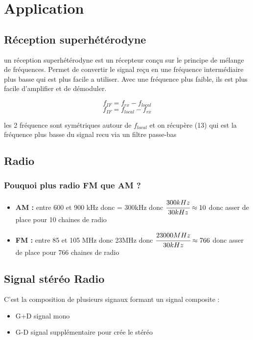 \section{Application}
	\subsection{Réception superhétérodyne}
		un réception superhétérodyne est un récepteur conçu sur le principe de mélange de fréquences. Permet de convertir le signal reçu en une fréquence intermédiaire plus basse qui est plus facile a utiliser. Avec une fréquence plus faible, ils est plus facile d'amplifier et de démoduler.
	
		\begin{equation}
			 f_{IF} = f_{rx}-f_{local}
		\end{equation}
		\begin{equation}
			 f_{IF} = f_{local}-f_{rx}
		\end{equation}
		
		les 2 fréquence sont symétriques autour de $f_{local}$ et on récupère (13) qui est la fréquence plus basse du signal recu via un filtre passe-bas
		
	\subsection{Radio}
		\subsubsection{Pouquoi plus radio FM que AM ?}
			\begin{itemize}
				\item \textbf{AM :} entre 600 et 900 kHz donc = 300kHz donc $\cfrac{300kHz}{30kHz} \approx 10$ donc asser de place pour 10 chaines de radio
				\item \textbf{FM :} entre 85 et 105 MHz donc 23MHz donc $\cfrac{23 000 MHz}{30kHz} \approx 766$ donc asser de place pour 766 chaines de radio
			\end{itemize}
			
		\subsection{Signal stéréo Radio}
			C'est la composition de plusieurs signaux formant un signal composite :
			\begin{itemize}
				\item G+D signal mono
				\item G-D signal supplémentaire pour crée le stéréo
			\end{itemize}
		

